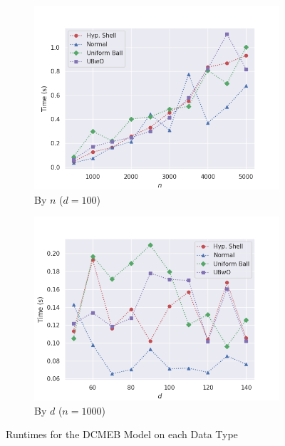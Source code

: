 \documentclass[11pt,twoside]{report}
\theoremstyle{definition}
\numberwithin{theorem}{section}
\numberwithin{definition}{section}
\numberwithin{lemma}{section}
\numberwithin{proposition}{section}
\numberwithin{equation}{section}
\numberwithin{figure}{section}
\begin{document}
\begin{figure}[ht]
    \centering
    \begin{subfigure}[b]{0.475\textwidth}
        \centering
        \includegraphics[width=\textwidth]{images/dcmeb_benchmarks/func_n_d100_eta0p9_uniform_ball_with_outliers.png}
        \caption{By $n$ ($d=100$)}
        \label{fig:dcmeb_plot_n}
    \end{subfigure}
    \hfill
    \begin{subfigure}[b]{0.475\textwidth}
        \centering
        \includegraphics[width=\textwidth]{images/dcmeb_benchmarks/func_d_n1000_eta0p9_uniform_ball_with_outliers.png}
        \caption{By $d$ ($n=1000$)}
        \label{fig:dcmeb_plot_d}
    \end{subfigure}
    \caption{Runtimes for the DCMEB Model on each Data Type}
    \label{fig:dcmeb_plot}
\end{figure}
\end{document}
